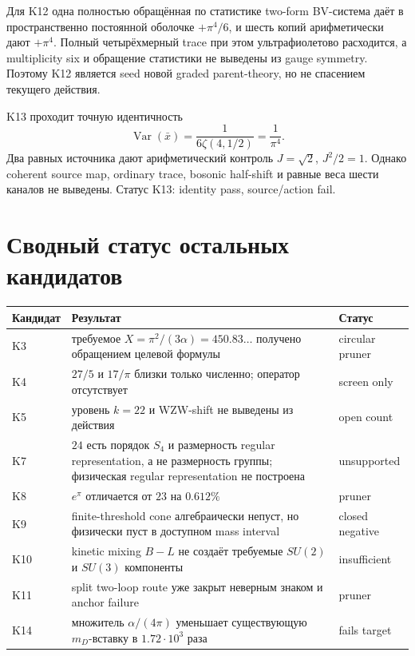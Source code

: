 Для K12 одна полностью обращённая по статистике two-form BV-система даёт
в пространственно постоянной оболочке \(+\pi^4/6\), и шесть копий
арифметически дают \(+\pi^4\). Полный четырёхмерный trace при этом
ультрафиолетово расходится, а multiplicity six и обращение статистики не
выведены из gauge symmetry. Поэтому K12 является seed новой graded
parent-theory, но не спасением текущего действия.

K13 проходит точную идентичность
\begin{equation}
 \operatorname{Var}(\bar x)
 =\frac1{6\zeta(4,1/2)}
 =\frac1{\pi^4}.
\end{equation}
Два равных источника дают арифметический контроль
\(J=\sqrt2\), \(J^2/2=1\). Однако coherent source map, ordinary trace,
bosonic half-shift и равные веса шести каналов не выведены. Статус K13:
identity pass, source/action fail.

\section{Сводный статус остальных кандидатов}

\begin{center}
\small
\begin{tabular}{>{\raggedright\arraybackslash}p{}>{\raggedright\arraybackslash}p{}>{\raggedright\arraybackslash}p{}}
\toprule
Кандидат & Результат & Статус \\
\midrule
K3 & требуемое \(X=\pi^2/(3\alpha)=450.83\ldots\) получено обращением целевой формулы & circular pruner \\
K4 & \(27/5\) и \(17/\pi\) близки только численно; оператор отсутствует & screen only \\
K5 & уровень \(k=22\) и WZW-shift не выведены из действия & open count \\
K7 & \(24\) есть порядок \(S_4\) и размерность regular representation, а не размерность группы; физическая regular representation не построена & unsupported \\
K8 & \(e^\pi\) отличается от \(23\) на \(0.612\%\) & pruner \\
K9 & finite-threshold cone алгебраически непуст, но физически пуст в доступном mass interval & closed negative \\
K10 & kinetic mixing \(B-L\) не создаёт требуемые \(SU(2)\) и \(SU(3)\) компоненты & insufficient \\
K11 & split two-loop route уже закрыт неверным знаком и anchor failure & pruner \\
K14 & множитель \(\alpha/(4\pi)\) уменьшает существующую \(m_D\)-вставку в \(1.72\cdot10^3\) раза & fails target \\
\bottomrule
\end{tabular}
\end{center}

